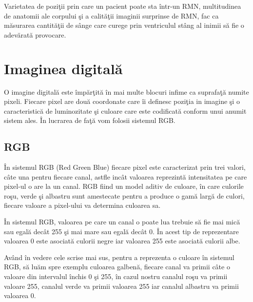 \par

Varietatea de pozi\c{t}ii prin care un pacient poate sta \^{i}ntr-un RMN, multitudinea de anatomii ale corpului \c{s}i a calit\u{a}\c{t}ii imaginii surprinse de RMN, fac ca m\u{a}surarea cantit\u{a}\c{t}ii de s\^{a}nge care curege prin ventriculul st\^{a}ng al inimii s\u{a} fie o adev\u{a}rat\u{a} provocare.

\section{Imaginea digital\u{a}}

O imagine digital\u{a} este \^{i}mp\u{a}r\c{t}it\u{a} \^{i}n mai multe blocuri infime ca suprafa\c{t}\u{a} numite pixeli. Fiecare pixel are dou\u{a} coordonate care \^{i}i definesc pozi\c{t}ia in imagine \c{s}i o caracteristic\u{a} de luminozitate \c{s}i culoare care este codificat\u{a} conform unui anumit sistem ales. \^{I}n lucrarea de fa\c{t}\u{a} vom folosii sistemul RGB.

\subsection{RGB}

\^{I}n sistemul RGB (Red Green Blue) fiecare pixel este caracterizat prin trei valori, c\^{a}te una pentru fiecare canal, astfle inc\^{a}t valoarea reprezint\u{a} intensitatea pe care pixel-ul o are la un canal. RGB fiind un model aditiv de culoare, \^{i}n care culorile ro\c{s}u, verde \c{s}i albastru sunt amestecate pentru a produce o gam\u{a} larg\u{a} de culori, fiecare valoare a pixel-ului va determina culoarea sa.

\par

\^{I}n sistemul RGB, valoarea pe care un canal o poate lua trebuie s\u{a} fie mai mic\u{a} sau egal\u{a} dec\^{a}t 255 \c{s}i mai mare sau egal\u{a} dec\^{a}t 0. \^{I}n acest tip de reprezentare valoarea 0 este asociat\u{a} culorii negre iar valoarea 255 este asociat\u{a} culorii albe. 

\par

Av\^{a}nd \^{i}n vedere cele scrise mai sus, pentru a reprezenta o culoare \^{i}n sistemul RGB, s\u{a} lu\u{a}m spre exemplu culoarea galben\u{a}, fiecare canal va primii c\^{a}te o valoare din intervalul \^{i}nchis 0 \c{s}i 255, \^{i}n cazul nostru canalul ro\c{s}u va primii valoare 255, canalul verde va primii valoarea 255 iar canalul albastru va primii valoarea 0.

